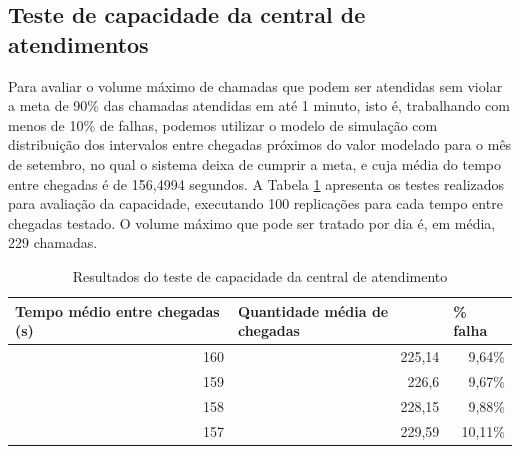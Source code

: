 \subsection{Teste de capacidade da central de atendimentos}
Para avaliar o volume máximo de chamadas que podem ser atendidas sem violar a meta de 90\% das chamadas atendidas em até 1 minuto, isto é, trabalhando com menos de 10\% de falhas, podemos utilizar o modelo de simulação com distribuição dos intervalos entre chegadas próximos do valor modelado para o mês de setembro, no qual o sistema deixa de cumprir a meta, e cuja média do tempo entre chegadas é de 156,4994 segundos. A Tabela \ref{tab: stress-test} apresenta os testes realizados para avaliação da capacidade, executando 100 replicações para cada tempo entre chegadas testado. O volume máximo que pode ser tratado por dia é, em média, 229 chamadas.

\begin{table}[H]
    \centering
    \begin{tabular}{|r|r|r|}
    \hline
    \multicolumn{1}{|l|}{Tempo médio entre chegadas (s)} & \multicolumn{1}{l|}{Quantidade média de chegadas} & \multicolumn{1}{l|}{\% falha} \\ \hline
    160 & 225,14 & 9,64\% \\ \hline
    159 & 226,6 & 9,67\% \\ \hline
    158 & 228,15 & 9,88\% \\ \hline
    157 & 229,59 & 10,11\% \\ \hline
    \end{tabular}
    \caption{Resultados do teste de capacidade da central de atendimento}
    \label{tab: stress-test}
 \end{table}